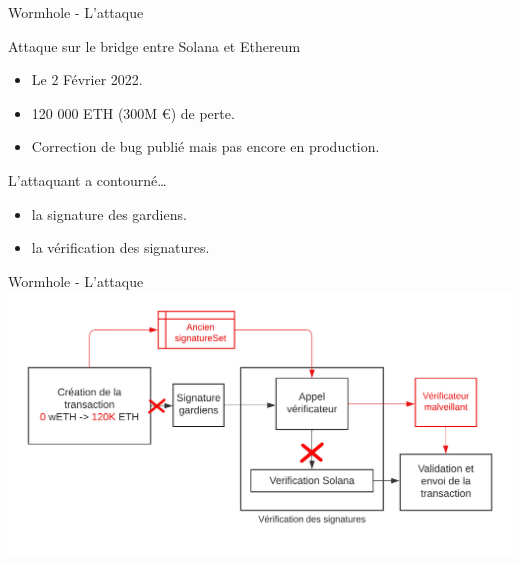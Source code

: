 \begin{frame}{Wormhole - L'attaque}
    \begin{block}{Attaque sur le bridge entre Solana et Ethereum}
        \begin{itemize}
            \item Le 2 Février 2022.
            \item 120 000 ETH (300M €) de perte.
            \item Correction de bug publié mais pas encore en production.
        \end{itemize}
    \end{block}
    \begin{block}{L'attaquant a contourné\dots}
        \begin{itemize}
            \item la signature des gardiens.
            \item la vérification des signatures. 
        \end{itemize}
    \end{block}
\end{frame}

\begin{frame}{Wormhole - L'attaque}
    \centering
    \includegraphics[scale=0.69]{centralisation/img/wormhole/worm_hack.png}
\end{frame}




